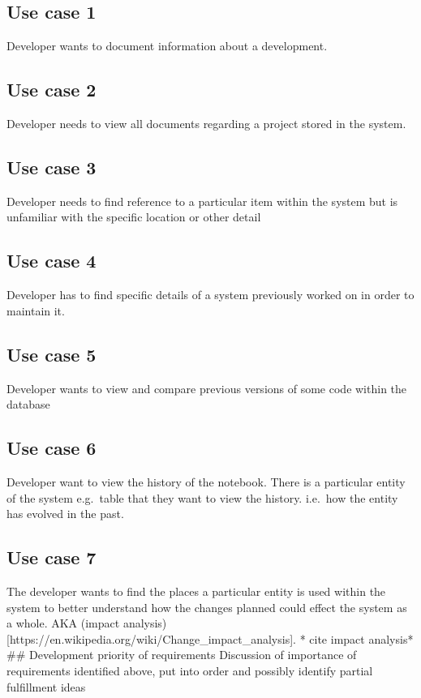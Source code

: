 \subsection{Use case 1}\label{use-case-1}

Developer wants to document information about a development.

\subsection{Use case 2}\label{use-case-2}

Developer needs to view all documents regarding a project stored in the
system.

\subsection{Use case 3}\label{use-case-3}

Developer needs to find reference to a particular item within the system
but is unfamiliar with the specific location or other detail

\subsection{Use case 4}\label{use-case-4}

Developer has to find specific details of a system previously worked on
in order to maintain it.

\subsection{Use case 5}\label{use-case-5}

Developer wants to view and compare previous versions of some code
within the database

\subsection{Use case 6}\label{use-case-6}

Developer want to view the history of the notebook. There is a
particular entity of the system e.g.~table that they want to view the
history. i.e.~how the entity has evolved in the past.

\subsection{Use case 7}\label{use-case-7}

The developer wants to find the places a particular entity is used
within the system to better understand how the changes planned could
effect the system as a whole. AKA (impact
analysis){[}https://en.wikipedia.org/wiki/Change\_impact\_analysis{]}. *
cite impact analysis* \#\# Development priority of requirements
Discussion of importance of requirements identified above, put into
order and possibly identify partial fulfillment ideas

